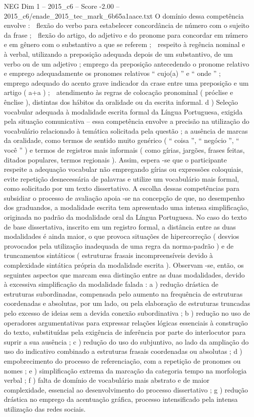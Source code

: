 \begin{textsample}{NEG Dim 1 – 2015\_c6 – Score -2.00 – 2015\_c6/enade\_2015\_tec\_mark\_6b65a1aace.txt}
O domínio dessa competência envolve :  flexão do verbo para estabelecer concordância de número com o sujeito da frase ;  flexão do artigo, do adjetivo e do pronome para concordar em número e em gênero com o substantivo a que se referem ;  respeito à regência nominal e à verbal, utilizando a preposição adequada depois de um substantivo, de um verbo ou de um adjetivo ; emprego da preposição antecedendo o pronome relativo e emprego adequadamente os pronomes relativos “ cujo(a) ” e “ onde ” ;  emprego adequado do acento grave indicador da crase entre uma preposição e um artigo ( a+a ) ;  atendimento às regras de colocação pronominal ( próclise e ênclise ), distintas dos hábitos da oralidade ou da escrita informal. d ) Seleção vocabular adequada à modalidade escrita formal da Língua Portuguesa, exigida pela situação comunicativa – essa competência envolve a precisão na utilização do vocabulário relacionado à temática solicitada pela questão ; a ausência de marcas da oralidade, como termos de sentido muito genérico ( “ coisa ”, “ negócio ”, “ você ” ) e termos de registros mais informais ( como gírias, jargões, frases feitas, ditados populares, termos regionais ).
Assim, espera -se que o participante respeite a adequação vocabular não empregando gírias ou expressões coloquiais, evite repetição desnecessária de palavras e utilize um vocabulário mais formal, como solicitado por um texto dissertativo.
A escolha dessas competências para subsidiar o processo de avaliação apoia -se na concepção de que, no desempenho dos graduandos, a modalidade escrita tem apresentado uma intensa simplificação, originada no padrão da modalidade oral da Língua Portuguesa.
No caso do texto de base dissertativa, inscrito em um registro formal, a distância entre as duas modalidades é ainda maior, o que provoca situações de hipercorreção ( desvios provocados pela utilização inadequada de uma regra da norma-padrão ) e de truncamentos sintáticos ( estruturas frasais incompreensíveis devido à complexidade sintática própria da modalidade escrita ).
Observam -se, então, os seguintes aspectos que marcam essa distinção entre as duas modalidades, devido à excessiva simplificação da modalidade falada : a ) redução drástica de estruturas subordinadas, compensada pelo aumento na frequência de estruturas coordenadas e absolutas, por um lado, ou pela elaboração de estruturas truncadas pelo excesso de ideias sem a devida conexão subordinativa ; b ) redução no uso de operadores argumentativas para expressar relações lógicas essenciais à construção do texto, substituídas pela exigência de inferência por parte do interlocutor para suprir a sua ausência ; c ) redução do uso do subjuntivo, ao lado da ampliação do uso do indicativo combinado a estruturas frasais coordenadas ou absolutas ; d ) empobrecimento do processo de referenciação, com a repetição de pronomes ou nomes ; e ) simplificação extrema da marcação da categoria tempo na morfologia verbal ; f ) falta de domínio de vocabulário mais abstrato e de maior complexidade, essencial ao desenvolvimento do processo dissertativo ; g ) redução drástica no emprego da acentuação gráfica, processo intensificado pela intensa utilização das redes sociais.

\end{textsample}

